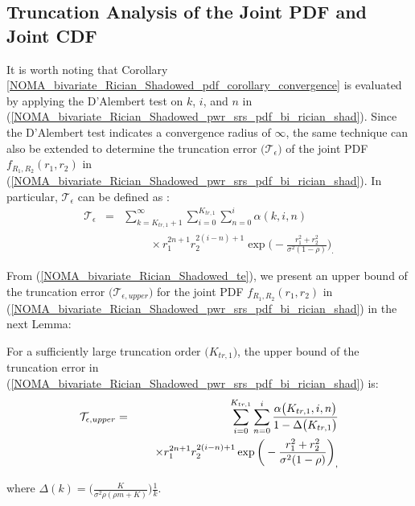 \subsection{Truncation Analysis of the Joint PDF and Joint CDF}
It is worth noting that Corollary \ref{NOMA_bivariate_Rician_Shadowed_pdf_corollary_convergence} is evaluated by applying the D'Alembert test on $k$, $i$, and $n$ in (\ref{NOMA_bivariate_Rician_Shadowed_pwr_srs_pdf_bi_rician_shad}). Since the D'Alembert test indicates a convergence radius of $\infty$, the same technique can also be extended to determine the truncation error $\big(\mathcal{T}_{\epsilon}\big)$ of the joint PDF $f_{R_1,R_2}(r_1,r_2)$ in (\ref{NOMA_bivariate_Rician_Shadowed_pwr_srs_pdf_bi_rician_shad}). In particular, $\mathcal{T}_{\epsilon}$ can be defined as \cite[eq. (92)]{o2011product}:
\begin{eqnarray} \label{NOMA_bivariate_Rician_Shadowed_te}
\mathcal{T}_{\epsilon} & = & \sum_{k=K_{tr,1} + 1}^{\infty} \sum_{i=0}^{K_{tr,1}} \sum_{n=0}^{i} \alpha(k,i,n) \nonumber \\
 & & \hspace{1cm} \times r_1^{2n+1} r_2^{2(i-n)+1} \exp\bigg( -\frac{r_1^2 + r_2^2}{\sigma^2 (1-\rho)} \bigg)_.
\end{eqnarray}

From (\ref{NOMA_bivariate_Rician_Shadowed_te}), we present an upper bound of the truncation error $\big(\mathcal{T}_{\epsilon,upper}\big)$ for the joint PDF $f_{R_1,R_2}(r_1,r_2)$ in (\ref{NOMA_bivariate_Rician_Shadowed_pwr_srs_pdf_bi_rician_shad}) in the next Lemma:
\begin{lemma} \label{NOMA_bivariate_Rician_Shadowed_lemma_te_upper}
For a sufficiently large truncation order $\big(K_{tr,1}\big)$, the upper bound of the truncation error in (\ref{NOMA_bivariate_Rician_Shadowed_pwr_srs_pdf_bi_rician_shad}) is:
\begin{eqnarray} \label{NOMA_bivariate_Rician_Shadowed_te_upper}
\mathcal{T}_{\epsilon,upper} & = & \sum_{i=0}^{K_{tr,1}} \sum_{n=0}^{i} \frac{\alpha\big(K_{tr,1},i,n\big)}{1-\Delta\big(K_{tr,1}\big)} \nonumber \\
 & & \hspace{0.5cm} \times r_1^{2n+1} r_2^{2(i-n)+1} \exp\bigg( -\frac{r_1^2 + r_2^2}{\sigma^2 (1-\rho)} \bigg)_,
\end{eqnarray}
\end{lemma}
where $\Delta(k) = \Big( \frac{K}{\sigma^2 \rho (\rho m + K)} \Big)\frac{1}{k}$.

